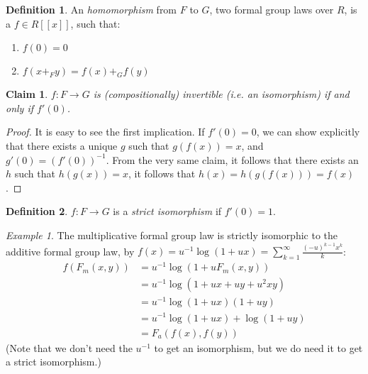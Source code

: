 \documentclass{article}
\newtheorem*{claim*}{Claim}
\theoremstyle{definition}
\newtheorem*{definition*}{Definition}
\theoremstyle{remark}
\newtheorem*{example*}{Example}
\begin{document}
	\begin{definition*}
		An \emph{homomorphism} from $F$ to $G$, two formal group laws over $R$, is a $f \in R\left[\left[x\right]\right]$, such that:
		\begin{enumerate}
			\item $f\left(0\right) = 0$
			\item $f\left(x +_F y\right) = f\left(x\right) +_G f\left(y\right)$
		\end{enumerate}
	\end{definition*}

	\begin{claim*}
		$f: F \to G$ is (compositionally) invertible (i.e. an isomorphism) if and only if $f'\left(0\right)$.
	\end{claim*}
	
	\begin{proof}
		It is easy to see the first implication.
		If $f'\left(0\right) = 0$, we can show explicitly that there exists a unique $g$ such that $g\left(f\left(x\right)\right) = x$, and $g'\left(0\right) = \left(f'\left(0\right)\right)^{-1}$. From the very same claim, it follows that there exists an $h$ such that $h\left(g\left(x\right)\right) = x$, it follows that $h\left(x\right) = h\left(g\left(f\left(x\right)\right)\right) = f\left(x\right)$.
	\end{proof}

	\begin{definition*}
		$f: F \to G$ is a \emph{strict isomorphism} if $f'\left(0\right)=1$.
	\end{definition*}

	\begin{example*}
		The multiplicative formal group law is strictly isomorphic to the additive formal group law,
		by $f\left(x\right) = u^{-1} \log \left(1+ux\right) = \sum_{k=1}^{\infty} \frac{\left(-u\right)^{k-1} x^k}{k}$:
		\begin{align*}
			f\left(F_m\left(x,y\right)\right)
			&= u^{-1} \log \left(1+u F_m\left(x,y\right)\right)\\
			&= u^{-1} \log \left(1+ux+uy+u^2 xy\right)\\
			&= u^{-1} \log \left(1+ux\right)\left(1+uy\right)\\
			&= u^{-1} \log \left(1+ux\right) + \log \left(1+uy\right)\\
			&= F_a\left(f\left(x\right), f\left(y\right)\right)
		\end{align*}
		(Note that we don't need the $u^{-1}$ to get an isomorphism, but we do need it to get a strict isomorphism.)
	\end{example*}
\end{document}

